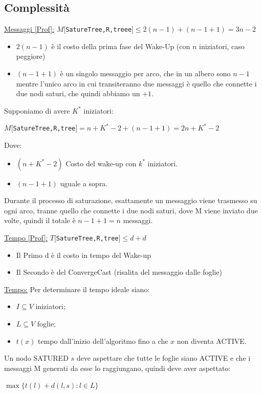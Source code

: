 \subsection{Complessità}
\underline{Messaggi [Prof]:}
$M[$\texttt{SatureTree,R,treee}$] \leq 2(n-1) + (n-1+1) = 3n - 2$
\begin{itemize}
    \item $2(n-1)$ è il costo della prima fase del Wake-Up (con $n$ iniziatori, caso peggiore)
    \item $(n-1+1)$ è un singolo messaggio per arco, che in un albero sono $n-1$
          mentre l'unico arco in cui transiteranno due messaggi è quello che connette i
          due nodi saturi, che quindi abbiamo un $+1$.
\end{itemize}
Supponiamo di avere $K^*$ iniziatori:
\begin{center}
    $M[$\texttt{SatureTree,R,tree}$] = n + K^* - 2 + (n-1+1) = 2n + K^* -2$\\
\end{center}
Dove:
\begin{itemize}
    \item $(n + K^* - 2)$ Costo del wake-up con $k^*$ iniziatori.
    \item $(n-1+1)$ uguale a sopra.
\end{itemize}

Durante il processo di saturazione, esattamente un messaggio viene trasmesso su
ogni arco, tranne quello che connette i due nodi saturi, dove M viene inviato
due volte, quindi il totale è $n-1+1 = n$ messaggi.


\underline{Tempo [Prof]:}
$T[$\texttt{SatureTree,R,tree}$] \leq d + d$
\begin{itemize}
    \item Il Primo d è il costo in tempo del Wake-up
    \item Il Secondo è del ConvergeCast (risalita del messaggio dalle foglie)
\end{itemize}
\underline{Tempo:}
Per determinare il tempo ideale siano:
\begin{itemize}
    \item $I \subseteq V$ iniziatori;
    \item $L \subseteq V$ foglie;
    \item $t(x)$ tempo dall'inizio dell'algoritmo fino a che $x$ non diventa
          ACTIVE.
\end{itemize}

Un nodo SATURED $s$ deve aspettare che tutte le foglie siano ACTIVE e che i
messaggi M generati da esse lo raggiungano, quindi deve aver aspettato:
\begin{center}
    $\max \lbrace t(l) + d(l,s) : l \in L \rbrace$
\end{center}

